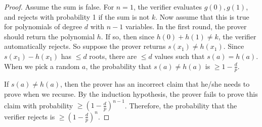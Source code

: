 \begin{proof}
\par Assume the sum is false. For $n=1$, the verifier evaluates $g(0), g(1)$, and rejects with probability 1 if the sum is not $k$. Now assume that this is true for polynomials of degree $d$ with $n-1$ variables. In the first round, the prover should return the polynomial $h$. If so, then since $h(0) + h(1) \ne k$, the verifier automatically rejects. So suppose the prover returns $s(x_1) \ne h(x_1)$. Since $s(x_1) - h(x_1)$ has $\le d$ roots, there are $\le d$ values such that $s(a) = h(a)$. When we pick a random $a$, the probability that $s(a) \ne h(a)$ is $\ge 1-\frac{d}{p}$. 

\par If $s(a) \ne h(a)$, then the prover has an incorrect claim that he/she needs to prove when we recurse. By the induction hypothesis, the prover fails to prove this claim with probability $\ge (1-\frac{d}{p})^{n-1}$. Therefore, the probability that the verifier rejects is $\ge (1-\frac{d}{p})^n$. 
\end{proof}
